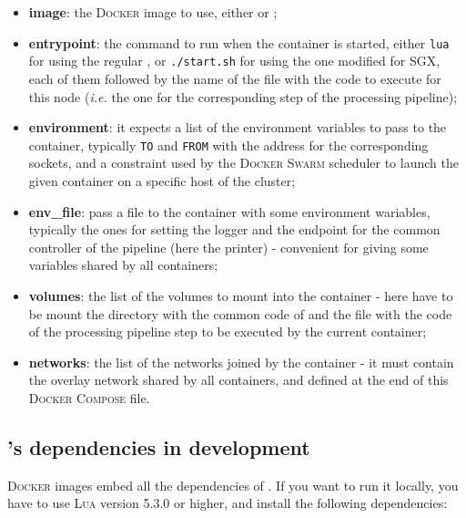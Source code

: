 \begin{itemize}
  \item \textbf{image}: the \textsc{Docker} image to use, either \dockerimagelua{} or \dockerimageluasgx{};
  \item \textbf{entrypoint}: the command to run when the container is started, either \texttt{lua} for using the regular \luavm{}, or \texttt{./start.sh} for using the one modified for SGX, each of them followed by the name of the file with the code to execute for this node (\textit{i.e.} the one for the corresponding step of the processing pipeline);
  \item \textbf{environment}: it expects a list of the environment variables to pass to the container, typically \texttt{TO} and \texttt{FROM} with the address for the corresponding sockets, and a constraint used by the \textsc{Docker Swarm} scheduler to launch the given container on a specific host of the cluster;
  \item \textbf{env\_file}: pass a file to the container with some environment wariables, typically the ones for setting the logger and the endpoint for the common controller of the pipeline (here the printer) - convenient for giving some variables shared by all containers;
  \item \textbf{volumes}: the list of the volumes to mount into the container - here have to be mount the directory with the common code of \SS{} and the file with the code of the processing pipeline step to be executed by the current container;
  \item \textbf{networks}: the list of the networks joined by the container - it must contain the overlay network shared by all containers, and defined at the end of this \textsc{Docker Compose} file.
\end{itemize}



\newpage

\subsection{\SS{}'s dependencies in development}
\label{subsec:ss-dependencies}

\textsc{Docker} images embed all the dependencies of \SS{}.
If you want to run it locally, you have to use \textsc{Lua} version 5.3.0 or higher, and install the following dependencies:

